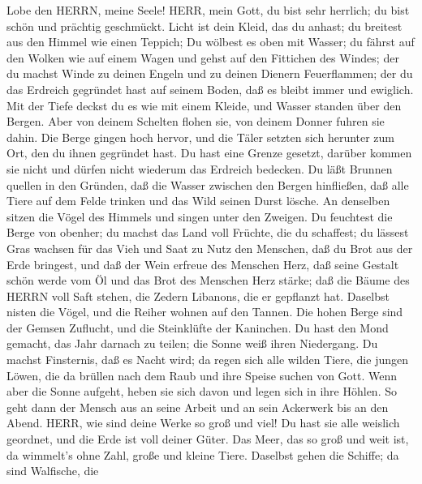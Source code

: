  Lobe den HERRN, meine Seele! HERR, mein Gott, du bist sehr
herrlich; du bist schön und prächtig geschmückt.  Licht ist
dein Kleid, das du anhast; du breitest aus den Himmel wie einen Teppich;
 Du wölbest es oben mit Wasser; du fährst auf den Wolken wie
auf einem Wagen und gehst auf den Fittichen des Windes;  der
du machst Winde zu deinen Engeln und zu deinen Dienern Feuerflammen;
 der du das Erdreich gegründet hast auf seinem Boden, daß es
bleibt immer und ewiglich.  Mit der Tiefe deckst du es wie
mit einem Kleide, und Wasser standen über den Bergen.  Aber
von deinem Schelten flohen sie, von deinem Donner fuhren sie dahin.
 Die Berge gingen hoch hervor, und die Täler setzten sich
herunter zum Ort, den du ihnen gegründet hast.  Du hast eine
Grenze gesetzt, darüber kommen sie nicht und dürfen nicht wiederum das
Erdreich bedecken.  Du läßt Brunnen quellen in den Gründen,
daß die Wasser zwischen den Bergen hinfließen,  daß alle
Tiere auf dem Felde trinken und das Wild seinen Durst lösche.
 An denselben sitzen die Vögel des Himmels und singen unter
den Zweigen.  Du feuchtest die Berge von obenher; du machst
das Land voll Früchte, die du schaffest;  du lässest Gras
wachsen für das Vieh und Saat zu Nutz den Menschen, daß du Brot aus der
Erde bringest,  und daß der Wein erfreue des Menschen Herz,
daß seine Gestalt schön werde vom Öl und das Brot des Menschen Herz
stärke;  daß die Bäume des HERRN voll Saft stehen, die
Zedern Libanons, die er gepflanzt hat.  Daselbst nisten die
Vögel, und die Reiher wohnen auf den Tannen.  Die hohen
Berge sind der Gemsen Zuflucht, und die Steinklüfte der Kaninchen.
 Du hast den Mond gemacht, das Jahr darnach zu teilen; die
Sonne weiß ihren Niedergang.  Du machst Finsternis, daß es
Nacht wird; da regen sich alle wilden Tiere,  die jungen
Löwen, die da brüllen nach dem Raub und ihre Speise suchen von Gott.
 Wenn aber die Sonne aufgeht, heben sie sich davon und
legen sich in ihre Höhlen.  So geht dann der Mensch aus an
seine Arbeit und an sein Ackerwerk bis an den Abend.  HERR,
wie sind deine Werke so groß und viel! Du hast sie alle weislich
geordnet, und die Erde ist voll deiner Güter.  Das Meer,
das so groß und weit ist, da wimmelt's ohne Zahl, große und kleine
Tiere.  Daselbst gehen die Schiffe; da sind Walfische, die
